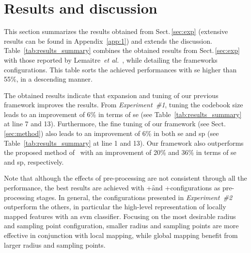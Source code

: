 
\section{Results and discussion}
\label{sec:res-dis}
This section summarizes the results obtained from Sect.\,\ref{sec:exp} (extensive results can be found in Appendix~\ref{app:1}) and extends the discussion.
Table~\ref{tab:results_summary} combines the obtained results from Sect.\,\ref{sec:exp} with those reported by Lemaitre~\emph{et al.}~\cite{Lemaintre2015miccaiOCT}, while detailing the frameworks configurations.
This table sorts the achieved performances with \ac{se} higher than 55\%, in a descending manner.

The obtained results indicate that expansion and tuning of our previous framework improves the results.
From \emph{Experiment~\#1}, tuning the codebook size leads to an improvement of 6\% in terms of \ac{se} (see Table~\ref{tab:results_summary} at line 7 and 13).
Furthermore, the fine tuning of our framework (see Sect.\,\ref{sec:method}) also leads to an improvement of 6\% in both \ac{se} and \ac{sp} (see Table~\ref{tab:results_summary} at line 1 and 13).
Our framework also outperforms the proposed method of~\cite{Venhuizen2015} with an improvement of 20\% and 36\% in terms of \ac{se} and \ac{sp}, respectively.

Note that although the effects of pre-processing are not consistent through all the performance, the best results are achieved with \nlm+\f and \nlm+\fal configurations as pre-processing stages.
In general, the configurations presented in \emph{Experiment~\#2} outperform the others, in particular the high-level representation of locally mapped features with an \ac{svm} classifier.  
Focusing on the most desirable radius and sampling point configuration, smaller radius and sampling points are more effective in conjunction with local mapping, while global mapping benefit from larger radius and sampling points.

